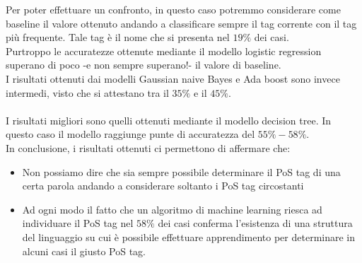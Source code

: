 \documentclass[10pt]{article}
\begin{document}
Per poter effettuare un confronto, in questo caso potremmo considerare come baseline il valore ottenuto andando a classificare sempre il tag corrente con il tag più frequente. Tale tag è il nome che si presenta nel $19\%$ dei casi.\\
Purtroppo le accuratezze ottenute mediante il modello logistic regression superano di poco -e non sempre superano!- il valore di baseline.\\
I risultati ottenuti dai modelli Gaussian naive Bayes e Ada boost sono invece intermedi, visto che si attestano tra il $35\%$ e il $45\%$.\\
\\
I risultati migliori sono quelli ottenuti mediante il modello decision tree. In questo caso il modello raggiunge punte di accuratezza del $55\%-58\%$.\\
In conclusione, i risultati ottenuti ci permettono di affermare che:
\begin{itemize}
	\item Non possiamo dire che sia sempre possibile determinare il PoS tag di una certa parola andando a considerare soltanto i PoS tag circostanti
	\item Ad ogni modo il fatto che un algoritmo di machine learning riesca ad individuare il PoS tag nel $58\%$ dei casi conferma l'esistenza di una struttura del linguaggio su cui è possibile effettuare apprendimento per determinare in alcuni casi il giusto PoS tag.  
\end{itemize}
\end{document}
